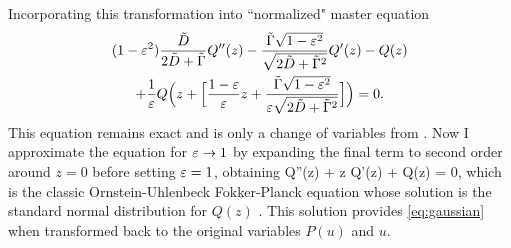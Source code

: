 Incorporating this transformation into \DIFdelbegin {}\DIFdelend \DIFaddbegin {}\DIFaddend ``normalized" master equation
\DIFdelbegin %
\DIFdelend \DIFaddbegin \begin{multline}(1-\varepsilon^2) \frac{\tilde{D}}{2\tilde{D} + \tilde{\Gamma}} Q''(z) - \frac{\tilde{\Gamma}\sqrt{1-\varepsilon^2}}{\sqrt{2\tilde{D}+\tilde{\Gamma}^2}}Q'(z) - Q(z) \\+ \frac{1}{\varepsilon} Q\Big(z + \Big[\frac{1-\varepsilon}{\varepsilon}z + \frac{\tilde{\Gamma}\sqrt{1-\varepsilon^2}}{\varepsilon\sqrt{2\tilde{D}+\tilde{\Gamma}^2}} \Big]\Big) = 0 .\end{multline}\DIFaddend 
This equation remains exact and is only a change of variables from \DIFdelbegin \DIFdel{(\ref{eq:master})}\DIFdelend \DIFaddbegin {}\DIFaddend .
Now I approximate the equation for $\varepsilon \rightarrow 1$ by expanding the final term to second order around $z=0$ before setting $\varepsilon = 1$, obtaining
\be Q''(z) + z Q'(z) + Q(z) = 0, \ee
which is the classic Ornstein-Uhlenbeck Fokker-Planck equation whose solution is the standard normal distribution for $Q(z)$ \citep[e.g.][]{Gardiner1983}.
This solution provides \DIFaddbegin {}\DIFaddend \ref{eq:gaussian} when transformed back to the original variables $P(u)$ and $u$.


